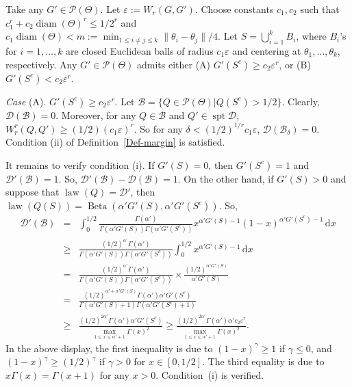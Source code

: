 \documentclass[MSNbibl,number,citesort]{arxbj}
\newcommand{\Dcal}{\mathcal{D}}
\newcommand{\Pcal}{\mathscr{P}}
\newcommand{\BB}{\mathscr{B}}
\newcommand{\Diam}{\operatorname{diam}}
\newcommand{\supp}{\operatorname{spt}}
\newcommand{\law}{\operatorname{law}}
\newcommand{\Wr}{W_r}
\begin{document}
\begin{pf}
Take any $G' \in\Pcal(\Theta)$. Let $\varepsilon:= \Wr(G,G')$.
Choose constants
$c_1, c_2$ such that $c_1^r + c_2 \Diam(\Theta)^r \leq1/2^{r}$
and $c_1 \Diam(\Theta) < m:= \min_{1 \leq i\neq j \leq k} \|\theta
_i -
\theta_j\|/4$.
%
Let $S = \bigcup_{i=1}^{k}B_i$, where $B_i$'s for $i=1,\ldots, k$
are closed Euclidean balls
of radius $c_1\varepsilon$ and centering at $\theta_1,\ldots, \theta_k$,
respectively.
Any $G' \in\Pcal(\Theta)$ admits either (A)
$G'(S^c) \geq c_2 \varepsilon^r$, or (B) $G'(S^c) < c_2 \varepsilon^r$.

\textit{Case} (A).
$G'(S^c) \geq c_2 \varepsilon^r$.
Let $\BB= \{Q \in\Pcal(\Theta)| Q(S^c) > 1/2\}$.
Clearly, $\Dcal(\BB) = 0$. Moreover, for any
$Q \in\BB$ and $Q' \in\supp\Dcal$,
$\Wr^r(Q,Q') \geq(1/2) (c_1\varepsilon)^r$. So for any $\delta<
(1/2)^{1/r}c_1 \varepsilon$,
$\Dcal(\BB_{\delta}) = 0$. Condition (ii) of Definition~\ref{Def-margin}
is satisfied.

It remains to verify condition (i).
If $G'(S) = 0$, then $G'(S^c) = 1$ and $\Dcal'(\BB) = 1$.
So, $\Dcal'(\BB)-\Dcal(\BB) = 1$.
On the other hand, if $G'(S) > 0$ and suppose that
$\law(Q) = \Dcal'$, then $\law(Q(S)) =
\operatorname{Beta}(\alpha' G'(S), \alpha' G'(S^c))$. So,
%
\begin{eqnarray*}
\Dcal'(\BB) & = & \int_{0}^{1/2}
\frac{\Gamma(\alpha' )}{\Gamma
(\alpha' G'(S))
\Gamma(\alpha' G'(S^c))} x^{\alpha' G'(S) - 1}(1-x)^{\alpha'
G'(S^c)-1} \,\mathrm{d}x
\\
&\geq& \frac{(1/2)^{\alpha'}\Gamma(\alpha' )}{\Gamma(\alpha'
G'(S))\Gamma
(\alpha' G'(S^c))} \int_{0}^{1/2}
x^{\alpha' G'(S)-1} \,\mathrm{d}x
\\
& = & \frac{(1/2)^{\alpha'}\Gamma(\alpha' )}{\Gamma(\alpha'
G'(S))\Gamma
(\alpha' G'(S^c))} \times\frac{(1/2)^{\alpha' G'(S)}}{\alpha' G'(S)}
\\
& = & \frac{(1/2)^{\alpha'+\alpha'G'(S)}\Gamma(\alpha' ) \alpha
'G'(S^c)}{\Gamma(\alpha' G'(S)+1)\Gamma(\alpha' G'(S^c)+1)}
\\
& \geq& \frac{(1/2)^{2\alpha'}\Gamma(\alpha' )\alpha' G'(S^c)}{
\max_{1\leq x \leq\alpha'+1} \Gamma(x)^2} \geq\frac
{(1/2)^{2\alpha'}\Gamma(\alpha' )\alpha' c_2\varepsilon^r}{
\max_{1\leq x \leq\alpha'+1} \Gamma(x)^2}.
\end{eqnarray*}
%
In the above display, the first inequality is due to $(1-x)^{\gamma}
\geq1$
if $\gamma\leq0$, and $(1-x)^{\gamma} \geq(1/2)^\gamma$ if $\gamma>
0$ for
$x \in[0,1/2]$.
The third equality is due to $x\Gamma(x) = \Gamma(x+1)$ for any $x > 0$.
Condition~(i) is verified.


\end{pf}
\end{document}
